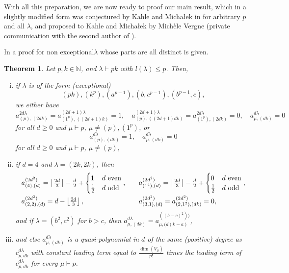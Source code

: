 \documentclass[a4paper]{amsart}
\newtheorem{theorem}{Theorem}
\def\N{{\mathbb{N}}}
\begin{document}
With all this preparation, we are now ready to proof our main result,
which in a slightly modified form was conjectured by Kahle and Micha\l ek in \cite[Conj. 4.3]{KM16} for arbitrary $p$ and all $\lambda$,
and proposed to Kahle and Micha\l ek by Mich\`ele Vergne (private communication with the second author of \cite{KM16}).

In \cite[Lemma 4.1]{KM16} a proof for \glqq non exceptional\grqq $\lambda$  whose parts are all distinct is given.
\begin{theorem}\label{connection:MainThm}
	Let $p,k\in\N$, and $\lambda\vdash pk$ with $l(\lambda)\leq p$.
	Then,
	\begin{enumerate}[(i)]
	\item
		if $\lambda$ is of the form (\glqq exceptional\grqq)
		\begin{displaymath}
			(pk),(k^{p}),(a^{p-1}),(b,c^{p-1}),(b^{p-1},c),
		\end{displaymath}
		we either have
		\begin{displaymath}
			a_{(p),(2dk)}^{2d\lambda}=a_{(1^{p}),((2d+1)k)}^{(2d+1)\lambda}=1,\quad a_{(p),((2d+1)dk)}^{(2d+1)\lambda}=a_{(1^p),(2dk)}^{2d\lambda}=0,\quad
			a_{\mu,(dk)}^{d\lambda}=0
		\end{displaymath}
		for all $d\geq 0$ and $\mu\vdash p$, $\mu\neq (p),(1^p)$, or
		\begin{displaymath}
			a_{(p),(dk)}^{d\lambda}=1,\quad
			a_{\mu,(dk)}^{d\lambda}=0
		\end{displaymath}
		for all $d\geq 0$ and $\mu\vdash p$, $\mu\neq(p)$,
	\item
		if $d=4$ and $\lambda=(2k,2k)$, then
		\begin{displaymath}
		\begin{array}{ll}
			a_{(4),(d)}^{(2d^2)}=
			\left\lfloor\frac{2d}{3}\right\rfloor-\frac{d}{2}+
			\begin{cases}
			1&d\mathrm{\ even}\\
			\frac{1}{2}&d\mathrm{\ odd}
			\end{cases},\quad &
			a_{(1^4),(d)}^{(2d^2)}=\left\lfloor\frac{2d}{3}\right\rfloor-\frac{d}{2}+
			\begin{cases}
			0&d\mathrm{\ even}\\
			\frac{1}{2}&d\mathrm{\ odd}
			\end{cases},\\[\bigskipamount]
			a_{(2,2),(d)}^{(2d^2)}=d-\left\lfloor\frac{2d}{3}\right\rfloor,&
			a_{(3,1),(d)}^{(2d^2)}=a_{(2,1^2),(dk)}^{(2d^2)}=0,
		\end{array}
		\end{displaymath}
		and if $\lambda=(b^2,c^2)$ for $b>c$, then $a_{\mu,(dk)}^{d\lambda}=a_{\mu,(d(k-a)}^{((b-c)^2))}$,
	\item
		and else $a_{\mu,(dk)}^{d\lambda}$ is a quasi-polynomial in $d$ of the same (positive) degree as $c_{p,dk}^{d\lambda}$ with constant leading term equal to $\frac{\dim(V_\mu)}{p!}$ times the leading term of $c_{p,dk}^{d\lambda}$
		for every $\mu\vdash p$.
	\end{enumerate}
\end{theorem}
\end{document}
